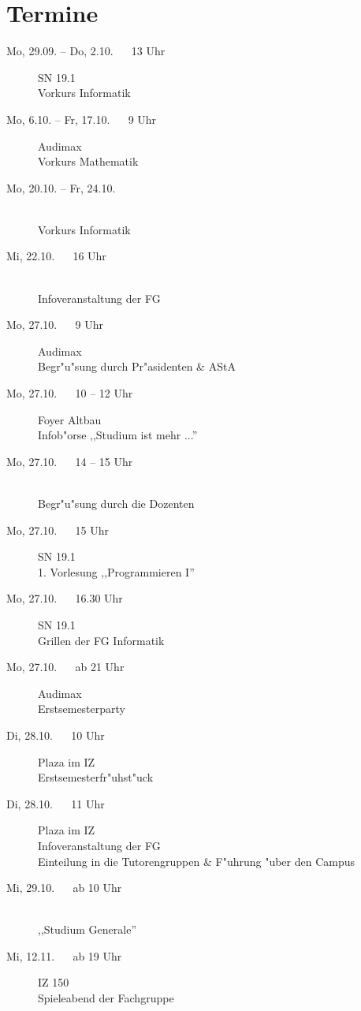 \section{Termine}

\begin{description}
  \item[Mo, 29.09. -- Do, 2.10. ~~ 13 Uhr] \hfill SN 19.1 \\
  Vorkurs Informatik
  \item[Mo, 6.10. -- Fr, 17.10. ~~ 9 Uhr] \hfill Audimax \\
  Vorkurs Mathematik
  \item[Mo, 20.10. -- Fr, 24.10.] \ \\
  Vorkurs Informatik\footnotemark[1]
  \item[Mi, 22.10. ~~ 16 Uhr] \ \\
  Infoveranstaltung der FG \\
  \item[Mo, 27.10. ~~ 9 Uhr] \hfill Audimax \\
  Begr"u"sung durch Pr"asidenten \& AStA
  \item[Mo, 27.10. ~~ 10 -- 12 Uhr] \hfill Foyer Altbau \\
  Infob"orse ,,Studium ist mehr ...''
  \item[Mo, 27.10. ~~ 14 -- 15 Uhr] \ \\
  Begr"u"sung durch die Dozenten
  \item[Mo, 27.10. ~~ 15 Uhr] SN 19.1 \\
  1. Vorlesung ,,Programmieren I''
  \item[Mo, 27.10. ~~ 16.30 Uhr] SN 19.1 \\
  Grillen der FG Informatik
  \item[Mo, 27.10. ~~ ab 21 Uhr] \hfill Audimax \\
  Erstsemesterparty
  \item[Di, 28.10. ~~ 10 Uhr] \hfill Plaza im IZ \\
  Erstsemesterfr"uhst"uck
  \item[Di, 28.10. ~~ 11 Uhr] \hfill Plaza im IZ \\
  Infoveranstaltung der FG \\
  Einteilung in die Tutorengruppen \& F"uhrung "uber den Campus
  \item[Mi, 29.10. ~~ ab 10 Uhr] \ \\
  ,,Studium Generale''
  \item[Mi, 12.11. ~~ ab 19 Uhr] \hfill IZ 150 \\
  Spieleabend der Fachgruppe
\end{description}

